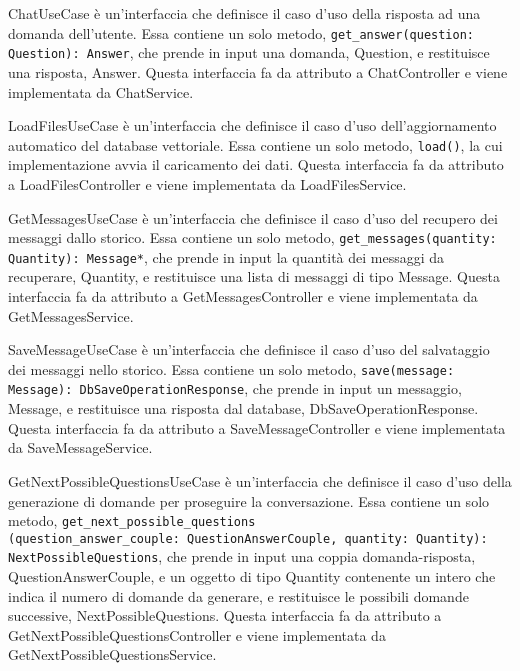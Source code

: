 \label{sec:chat_use_case}
ChatUseCase è un'interfaccia che definisce il caso d'uso della risposta ad una domanda dell'utente. Essa contiene un solo metodo, \texttt{get\_answer(question: Question): Answer}, che prende in input una domanda, Question, e restituisce una risposta, Answer. Questa interfaccia fa da attributo a ChatController e viene implementata da ChatService.

\label{sec:load_files_use_case}
LoadFilesUseCase è un'interfaccia che definisce il caso d'uso dell'aggiornamento automatico del database vettoriale. Essa contiene un solo metodo, \texttt{load()}, la cui implementazione avvia il caricamento dei dati. Questa interfaccia fa da attributo a LoadFilesController e viene implementata da LoadFilesService.

\label{sec:get_messages_use_case}
GetMessagesUseCase è un'interfaccia che definisce il caso d'uso del recupero dei messaggi dallo storico. Essa contiene un solo metodo, \texttt{get\_messages(quantity: Quantity): Message*}, che prende in input la quantità dei messaggi da recuperare, Quantity, e restituisce una lista di messaggi di tipo Message. Questa interfaccia fa da attributo a GetMessagesController e viene implementata da GetMessagesService.

\label{sec:save_message_use_case}
SaveMessageUseCase è un'interfaccia che definisce il caso d'uso del salvataggio dei messaggi nello storico. Essa contiene un solo metodo, \texttt{save(message: Message): DbSaveOperationResponse}, che prende in input un messaggio, Message, e restituisce una risposta dal database, DbSaveOperationResponse. Questa interfaccia fa da attributo a SaveMessageController e viene implementata da SaveMessageService.

\label{sec:get_next_possible_questions_use_case}
GetNextPossibleQuestionsUseCase è un'interfaccia che definisce il caso d'uso della generazione di domande per proseguire la conversazione. Essa contiene un solo metodo, \texttt{get\_next\_possible\_questions\\(question\_answer\_couple: QuestionAnswerCouple, quantity: Quantity):\\ NextPossibleQuestions}, che prende in input una coppia domanda-risposta, QuestionAnswerCouple, e un oggetto di tipo Quantity contenente un intero che indica il numero di domande da generare, e restituisce le possibili domande successive, NextPossibleQuestions. Questa interfaccia fa da attributo a GetNextPossibleQuestionsController e viene implementata da GetNextPossibleQuestionsService.

